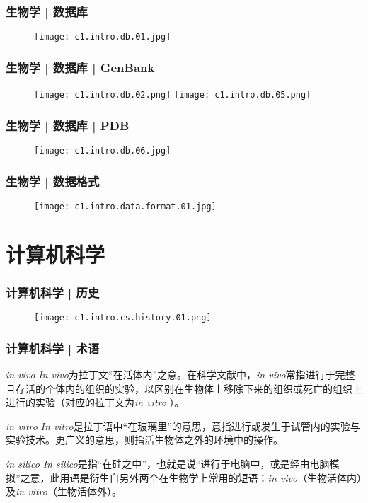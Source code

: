 \begin{frame}
  \frametitle{生物学 | \alert{数据库}}
  \begin{figure}
    \centering
    \texttt{[image: c1.intro.db.01.jpg]}
  \end{figure}
\end{frame}

\begin{frame}
  \frametitle{生物学 | 数据库 | GenBank}
  \begin{figure}
    \texttt{[image: c1.intro.db.02.png]}
    \texttt{[image: c1.intro.db.05.png]}
  \end{figure}
\end{frame}

\begin{frame}
  \frametitle{生物学 | 数据库 | PDB}
  \begin{figure}
    \centering
    \texttt{[image: c1.intro.db.06.jpg]}
  \end{figure}
\end{frame}

\begin{frame}
  \frametitle{生物学 | 数据格式}
  \begin{figure}
    \centering
    \texttt{[image: c1.intro.data.format.01.jpg]}
  \end{figure}
\end{frame}

\section{计算机科学}
\begin{frame}
  \frametitle{计算机科学 | 历史}
  \begin{figure}
    \centering
    \texttt{[image: c1.intro.cs.history.01.png]}
  \end{figure}
\end{frame}

\begin{frame}
  \frametitle{计算机科学 | \alert{术语}}
  \begin{block}{\textit{in vivo}}
  \textit{In vivo}为拉丁文“在活体内”之意。在科学文献中，\textit{in vivo}常指进行于完整且存活的个体内的组织的实验，以区别在生物体上移除下来的组织或死亡的组织上进行的实验（对应的拉丁文为\textit{in vitro }）。
  \end{block}
  \pause
  \begin{block}{\textit{in vitro}}
    \textit{In vitro}是拉丁语中“在玻璃里”的意思，意指进行或发生于试管内的实验与实验技术。更广义的意思，则指活生物体之外的环境中的操作。
  \end{block}
  \pause
  \begin{block}{\textit{in silico}}
    \textit{In
    silico}是指“在硅之中”，也就是说“进行于电脑中，或是经由电脑模拟”之意，此用语是衍生自另外两个在生物学上常用的短语：\textit{in vivo}（生物活体内）及\textit{in vitro}（生物活体外）。
  \end{block}
\end{frame}

